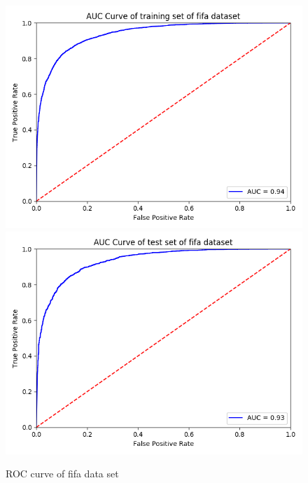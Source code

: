 \documentclass{article}
\begin{document}
\begin{figure}[h]
  \centering
  \includegraphics[scale=0.3]{auc_fifa_train.png}
  \includegraphics[scale=0.3]{auc_fifa_test.png}
  \caption{ROC curve of fifa data set}
\end{figure}

\FloatBarrier
\end{document}
